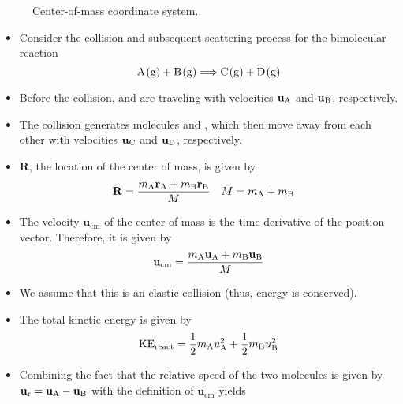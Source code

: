 \documentclass[../notes.tex]{subfiles}
\begin{document}
\begin{itemize}
\begin{figure}[h!]
        \caption{Center-of-mass coordinate system.}
        \label{fig:COMcoordinates}
    \end{figure}
    \begin{itemize}
        \item Consider the collision and subsequent scattering process for the bimolecular reaction
        \begin{equation*}
            \ce{A(g) + B(g)} \Longrightarrow \ce{C(g) + D(g)}
        \end{equation*}
        \item Before the collision,  and  are traveling with velocities $\mathbf{u}_{\ce{A}}$ and $\mathbf{u}_{\ce{B}}$, respectively.
        \item The collision generates molecules  and , which then move away from each other with velocities $\mathbf{u}_{\ce{C}}$ and $\mathbf{u}_{\ce{D}}$, respectively.
        \item $\mathbf{R}$, the location of the center of mass, is given by
        \begin{align*}
            \mathbf{R} &= \frac{m_{\ce{A}}\mathbf{r}_{\ce{A}}+m_{\ce{B}}\mathbf{r}_{\ce{B}}}{M}&
            M &= m_{\ce{A}}+m_{\ce{B}}
        \end{align*}
        \item The velocity $\mathbf{u}_\text{cm}$ of the center of mass is the time derivative of the position vector. Therefore, it is given by
        \begin{equation*}
            \mathbf{u}_\text{cm} = \frac{m_{\ce{A}}\mathbf{u}_{\ce{A}}+m_{\ce{B}}\mathbf{u}_{\ce{B}}}{M}
        \end{equation*}
        \item We assume that this is an elastic collision (thus, energy is conserved).
        \item The total kinetic energy is given by
        \begin{equation*}
            \text{KE}_\text{react} = \frac{1}{2}m_{\ce{A}}u_{\ce{A}}^2+\frac{1}{2}m_{\ce{B}}u_{\ce{B}}^2
        \end{equation*}
        \item Combining the fact that the relative speed of the two molecules is given by $\mathbf{u}_\text{r}=\mathbf{u}_{\ce{A}}-\mathbf{u}_{\ce{B}}$ with the definition of $\mathbf{u}_\text{cm}$ yields

\end{itemize}
\end{itemize}
\end{document}

